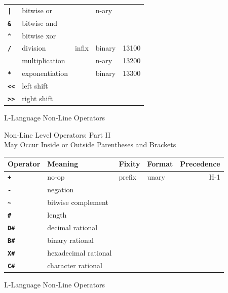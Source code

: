 \documentclass[12pt]{article}
\newcommand{\ttkey}[1]{{\tt \bfseries #1}}
\newlength{\figurewidth}
\newenvironment{boxedfigure}[1][!btp]%
	{\begin{figure*}[#1]
	 \begin{lrbox}{\figurebox}
	 \begin{minipage}{\figurewidth}

	 \vspace*{1ex}}%
	{
	 \vspace*{1ex}

	 \end{minipage}
	 \end{lrbox}

	 \centering
	 \fbox{\hspace*{0.1in}\usebox{\figurebox}\hspace*{0.1in}}
	 \end{figure*}}
\begin{document}
\begin{boxedfigure}[!p]
\begin{center}
\begin{tabular}{|l|l|l|l|r|}
\\\cline{1-2}\cline{4-4}
\ttkey{|}  & bitwise or & & n-ary &
\\\cline{1-2}
\ttkey{\&}  & bitwise and & & &
\\\cline{1-2}
\ttkey{\textasciicircum}  & bitwise xor & & &
\\\hline
\ttkey{/}  & division & infix & binary & 13100
\\\cline{1-2}\cline{4-5}
\ttkey{*}  & multiplication & & n-ary & 13200
\\\cline{1-2}\cline{4-5}
\ttkey{**}  & exponentiation & & binary & 13300
\\\cline{1-2}
\ttkey{<{}<}  & left shift & & &
\\\cline{1-2}
\ttkey{>{}>}  & right shift & & &
\\\hline

\end{tabular}
\end{center}

\caption{L-Language Non-Line Operators}
\label{L-LANGUAGE-NON-LINE-OPERATORS-1}
\end{boxedfigure}

\clearpage

\begin{boxedfigure}[!t]
\begin{center}
Non-Line Level Operators: Part II \\
May Occur Inside or Outside Parentheses and Brackets
\\[1ex]
\begin{tabular}{|l|l|l|l|r|}
\hline
Operator & Meaning & Fixity & Format & Precedence \\
\hline
\ttkey{+}  & no-op & prefix & unary & H-1
\\\cline{1-2}
\ttkey{-}  & negation & & & 
\\\cline{1-2}
\ttkey{\textasciitilde}  & bitwise complement & & & 
\\\cline{1-2}
\ttkey{\#}  & length & & & 
\\\cline{1-2}
\ttkey{D\#}  & decimal rational & & & 
\\\cline{1-2}
\ttkey{B\#}  & binary rational & & & 
\\\cline{1-2}
\ttkey{X\#}  & hexadecimal rational & & & 
\\\cline{1-2}
\ttkey{C\#}  & character rational & & & 
\\\hline

\end{tabular}
\end{center}

\caption{L-Language Non-Line Operators}
\label{L-LANGUAGE-NON-LINE-OPERATORS-2}
\end{boxedfigure}
\end{document}
